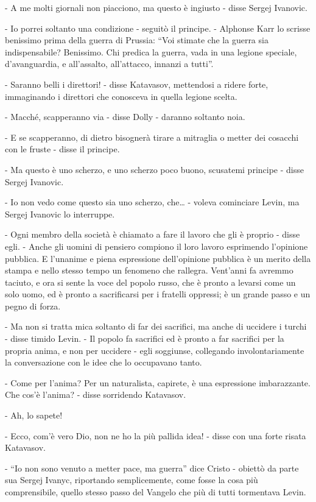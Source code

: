 - A me molti giornali non piacciono, ma questo è ingiusto - disse Sergej Ivanovic. 

- Io porrei soltanto una condizione - seguitò il principe. - Alphonse Karr lo scrisse benissimo prima della guerra di Prussia: ``Voi stimate che la guerra sia indispensabile? Benissimo. Chi predica la guerra, vada in una legione speciale, d'avanguardia, e all'assalto, all'attacco, innanzi a tutti''. 

- Saranno belli i direttori! - disse Katavasov, mettendosi a ridere forte, immaginando i direttori che conosceva in quella legione scelta. 

- Macché, scapperanno via - disse Dolly - daranno soltanto noia. 

- E se scapperanno, di dietro bisognerà tirare a mitraglia o metter dei cosacchi con le fruste - disse il principe. 

- Ma questo è uno scherzo, e uno scherzo poco buono, scusatemi principe - disse Sergej Ivanovic. 

- Io non vedo come questo sia uno scherzo, che\ldots{} - voleva cominciare Levin, ma Sergej Ivanovic lo interruppe. 

- Ogni membro della società è chiamato a fare il lavoro che gli è proprio - disse egli. - Anche gli uomini di pensiero compiono il loro lavoro esprimendo l'opinione pubblica. E l'unanime e piena espressione dell'opinione pubblica è un merito della stampa e nello stesso tempo un fenomeno che rallegra. Vent'anni fa avremmo taciuto, e ora si sente la voce del popolo russo, che è pronto a levarsi come un solo uomo, ed è pronto a sacrificarsi per i fratelli oppressi; è un grande passo e un pegno di forza. 

- Ma non si tratta mica soltanto di far dei sacrifici, ma anche di uccidere i turchi - disse timido Levin. - Il popolo fa sacrifici ed è pronto a far sacrifici per la propria anima, e non per uccidere - egli soggiunse, collegando involontariamente la conversazione con le idee che lo occupavano tanto. 

- Come per l'anima? Per un naturalista, capirete, è una espressione imbarazzante. Che cos'è l'anima? - disse sorridendo Katavasov. 

- Ah, lo sapete! 

- Ecco, com'è vero Dio, non ne ho la più pallida idea! - disse con una forte risata Katavasov. 

- ``Io non sono venuto a metter pace, ma guerra'' dice Cristo - obiettò da parte sua Sergej Ivanyc, riportando semplicemente, come fosse la cosa più comprensibile, quello stesso passo del Vangelo che più di tutti tormentava Levin. 

